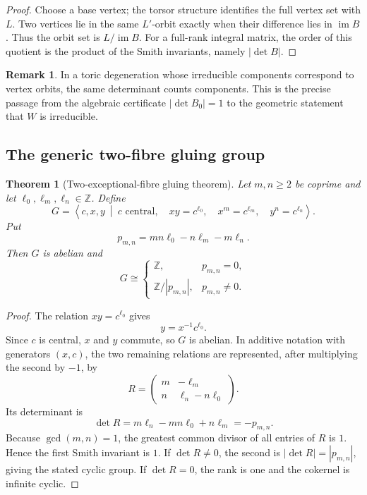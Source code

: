 \documentclass[11pt,reqno]{amsart}
\numberwithin{equation}{section}
\newcommand{\Z}{\mathbb Z}
\newcommand{\im}{\operatorname{im}}
\newtheorem{theorem}{Theorem}[section]
\theoremstyle{definition}
\newtheorem{remark}[remark]{Remark}
\begin{document}
\begin{proof}
Choose a base vertex; the torsor structure identifies the full vertex set with $L$. Two vertices lie in the same $L'$-orbit exactly when their difference lies in $\im B$. Thus the orbit set is $L/\im B$. For a full-rank integral matrix, the order of this quotient is the product of the Smith invariants, namely $|\det B|$.
\end{proof}

\begin{remark}
In a toric degeneration whose irreducible components correspond to vertex orbits, the same determinant counts components. This is the precise passage from the algebraic certificate $|\det B_0|=1$ to the geometric statement that $W$ is irreducible.
\end{remark}

\subsection{The generic two-fibre gluing group}

\begin{theorem}[Two-exceptional-fibre gluing theorem]\label{thm:gluing-group}
Let $m,n\ge2$ be coprime and let $\ell_0,\ell_m,\ell_n\in\Z$. Define
\[
G=\left\langle c,x,y\ \middle|\
 c\text{ central},\quad
 xy=c^{\ell_0},\quad
 x^m=c^{\ell_m},\quad
 y^n=c^{\ell_n}
\right\rangle.
\]
Put
\begin{equation}\label{eq:general-defect}
p_{m,n}=mn\ell_0-n\ell_m-m\ell_n.
\end{equation}
Then $G$ is abelian and
\[
G\cong
\begin{cases}
\Z,&p_{m,n}=0,\\
\Z/|p_{m,n}|,&p_{m,n}\ne0.
\end{cases}
\]
\end{theorem}

\begin{proof}
The relation $xy=c^{\ell_0}$ gives
\[
y=x^{-1}c^{\ell_0}.
\]
Since $c$ is central, $x$ and $y$ commute, so $G$ is abelian. In additive notation with generators $(x,c)$, the two remaining relations are represented, after multiplying the second by $-1$, by
\[
R=
\begin{pmatrix}
m&-\ell_m\\
n&\ell_n-n\ell_0
\end{pmatrix}.
\]
Its determinant is
\[
\det R=m\ell_n-mn\ell_0+n\ell_m=-p_{m,n}.
\]
Because $\gcd(m,n)=1$, the greatest common divisor of all entries of $R$ is $1$. Hence the first Smith invariant is $1$. If $\det R\ne0$, the second is $|\det R|=|p_{m,n}|$, giving the stated cyclic group. If $\det R=0$, the rank is one and the cokernel is infinite cyclic.
\end{proof}
\end{document}

